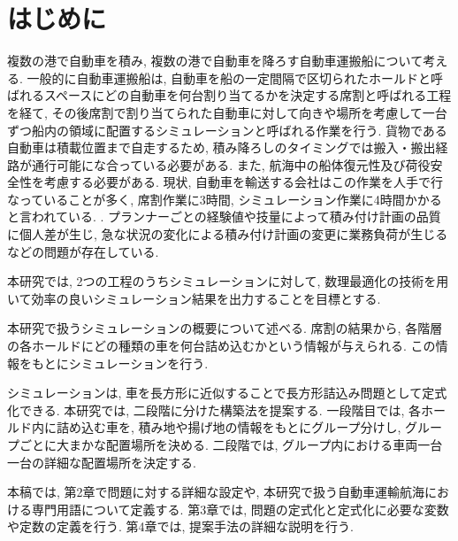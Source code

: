 \chapter{はじめに}

複数の港で自動車を積み, 複数の港で自動車を降ろす自動車運搬船について考える. 
一般的に自動車運搬船は, 自動車を船の一定間隔で区切られたホールドと呼ばれるスペースにどの自動車を何台割り当てるかを決定する席割と呼ばれる工程を経て, その後席割で割り当てられた自動車に対して向きや場所を考慮して一台ずつ船内の領域に配置するシミュレーションと呼ばれる作業を行う. 
貨物である自動車は積載位置まで自走するため, 積み降ろしのタイミングでは搬入・搬出経路が通行可能にな合っている必要がある. 
また, 航海中の船体復元性及び荷役安全性を考慮する必要がある. 
現状, 自動車を輸送する会社はこの作業を人手で行なっていることが多く, 席割作業に3時間, シミュレーション作業に4時間かかると言われている. \cite{mitsui}. 
プランナーごとの経験値や技量によって積み付け計画の品質に個人差が生じ, 急な状況の変化による積み付け計画の変更に業務負荷が生じるなどの問題が存在している. 

本研究では, 2つの工程のうちシミュレーションに対して, 数理最適化の技術を用いて効率の良いシミュレーション結果を出力することを目標とする. 

本研究で扱うシミュレーションの概要について述べる. 
席割の結果から, 各階層の各ホールドにどの種類の車を何台詰め込むかという情報が与えられる. 
この情報をもとにシミュレーションを行う. 

シミュレーションは, 車を長方形に近似することで長方形詰込み問題として定式化できる. 
本研究では, 二段階に分けた構築法を提案する. 
一段階目では, 各ホールド内に詰め込む車を, 積み地や揚げ地の情報をもとにグループ分けし, グループごとに大まかな配置場所を決める. 
二段階では, グループ内における車両一台一台の詳細な配置場所を決定する. 

本稿では, 第2章で問題に対する詳細な設定や, 本研究で扱う自動車運輸航海における専門用語について定義する. 
第3章では, 問題の定式化と定式化に必要な変数や定数の定義を行う. 
第4章では, 提案手法の詳細な説明を行う. 

